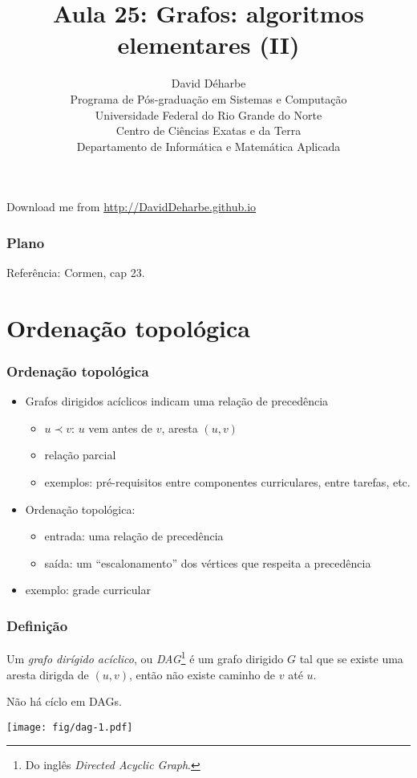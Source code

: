 \documentclass{beamer}
\title{Aula 25: Grafos: algoritmos elementares (II)}
\author{David Déharbe \\
  Programa de Pós-graduação em Sistemas e Computação \\
  Universidade Federal do Rio Grande do Norte \\
  Centro de Ciências Exatas e da Terra \\
  Departamento de Informática e Matemática Aplicada}
\date{}
\begin{document}

\begin{frame}
  \titlepage

  Download me from \url{http://DavidDeharbe.github.io}
\end{frame}

\begin{frame}
  \frametitle{Plano}
  \tableofcontents

Referência: Cormen, cap 23.
\end{frame}

\section{Ordenação topológica}

\begin{frame}
\frametitle{Ordenação topológica}

\begin{itemize}
\item Grafos dirigidos acíclicos indicam uma relação de precedência
\begin{itemize}
\item $u \prec v$: $u$ vem antes de $v$, aresta $(u, v)$
\item relação parcial
\item exemplos: pré-requisitos entre componentes curriculares, entre tarefas, etc.
\end{itemize}
\item Ordenação topológica:
\begin{itemize}
\item entrada: uma relação de precedência
\item saída: um ``escalonamento'' dos vértices que respeita a precedência
\end{itemize}
\item exemplo: grade curricular
\end{itemize}
\end{frame}

\begin{frame}
\frametitle{Definição}

\begin{definition}
Um \emph{grafo dirígido acíclico}, ou \emph{DAG}\footnote{Do inglês \textit{Directed Acyclic Graph}.}  é um grafo dirigido $G$ tal que se existe uma aresta dirigda de $(u, v)$, então não existe caminho de $v$ até $u$.
\end{definition}

Não há cíclo em DAGs.

\begin{center}
\texttt{[image: fig/dag-1.pdf]}
\end{center}

\end{frame}
\end{document}
